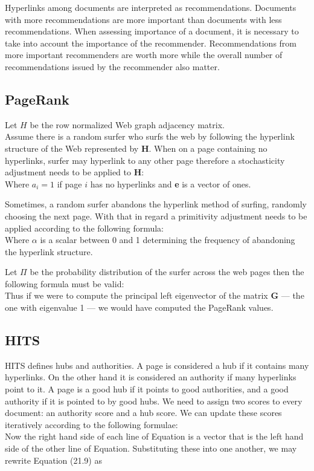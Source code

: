\documentclass[10pt, a4paper]{article}
\begin{document}
Hyperlinks among documents are interpreted as recommendations. Documents with more recommendations are more important than documents with less recommendations. When assessing importance of a document, it is necessary to take into account the importance of the recommender. Recommendations from more important recommenders are worth more while the overall number of recommendations issued by the recommender also matter.

\subsection{PageRank}
Let \textbf{$H$} be the row normalized Web graph adjacency matrix.
$$$$
Assume there is a random surfer who surfs the web by following the hyperlink structure of the Web represented by \textbf{H}. When on a page containing no hyperlinks, surfer may hyperlink to any other page therefore a stochasticity adjustment needs to be applied to \textbf{H}:
$$$$
Where $a_i = 1$ if page $i$ has no hyperlinks and \textbf{e} is a vector of ones.

Sometimes, a random surfer abandons the hyperlink method of surfing, randomly choosing the next page. With that in regard a primitivity adjustment needs to be applied according to the following formula:
$$$$
Where $\alpha$ is a scalar between 0 and 1 determining the frequency of abandoning the hyperlink structure.

Let $\Pi$ be the probability distribution of the surfer across the web pages then the following formula must be valid:
$$$$
Thus if we were to compute the principal left eigenvector of the matrix \textbf{G} — the one with eigenvalue 1 — we would have computed the PageRank values.

\subsection{HITS}
HITS defines hubs and authorities. A page is considered a hub if it contains many hyperlinks. On the other hand it is considered an authority if many hyperlinks point to it. A page is a good hub if it points to good authorities, and a good authority if it is pointed to by good hubs. We need to assign two scores to every document: an authority score and a hub score. We can update these scores iteratively according to the following formulae:
$$$$
Now the right hand side of each line of Equation is a vector that is the left hand side of the other line of Equation. Substituting these into one another, we may rewrite Equation (21.9) as
\end{document}
